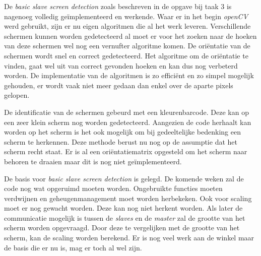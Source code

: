 De {\it basic slave screen detection} zoals beschreven in de opgave bij taak 3 is nagenoeg volledig geïmplementeerd en werkende. Waar er in het begin {\it openCV} werd gebruikt, zijn er nu eigen algoritmen die al het werk leveren. Verschillende schermen kunnen worden gedetecteerd al moet er voor het zoeken naar de hoeken van deze schermen wel nog een vernufter algoritme komen. De oriëntatie van de schermen wordt snel en correct gedetecteerd. Het algoritme om de oriëntatie te vinden, gaat wel uit van correct gevonden hoeken en kan dus nog verbeterd worden. De implementatie van de algoritmen is zo efficiënt en zo simpel mogelijk gehouden, er wordt vaak niet meer gedaan dan enkel over de aparte pixels gelopen.

De identificatie van de schermen gebeurd met een kleurenbarcode. Deze kan op een zeer klein scherm nog worden gedetecteerd. Aangezien de code herhaalt kan worden op het scherm is het ook mogelijk om bij gedeeltelijke bedenking een scherm te herkennen. Deze methode berust nu nog op de assumptie dat het scherm recht staat. Er is al een oriëntatiematrix opgesteld om het scherm naar behoren te draaien maar dit is nog niet geïmplementeerd.

De basis voor {\it basic slave screen detection} is gelegd. De komende weken zal de code nog wat opgeruimd moeten worden. Ongebruikte functies moeten verdwijnen en geheugenmanagement moet worden herbekeken. Ook voor scaling moet er nog gewacht worden. Deze kan nog niet herkent worden. Als later de communicatie mogelijk is tussen de {\it slaves} en de {\it master} zal de grootte van het scherm worden opgevraagd. Door deze te vergelijken met de grootte van het scherm, kan de scaling worden berekend. Er is nog veel werk aan de winkel maar de basis die er nu is, mag er toch al wel zijn.